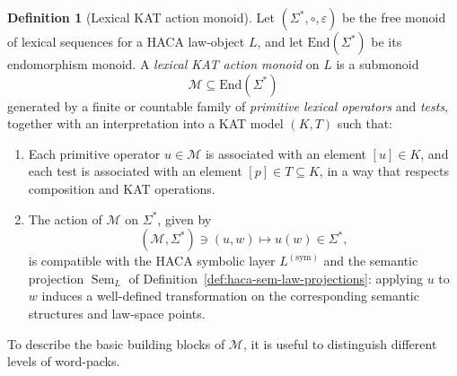 \documentclass[11pt]{book}
\theoremstyle{plain}
\theoremstyle{definition}
\newtheorem{definition}[theorem]{Definition}
\theoremstyle{remark}
\begin{document}
\begin{definition}[Lexical KAT action monoid]
\label{def:lex-kat-action-monoid}
Let $(\Sigma^*,\circ,\varepsilon)$ be the free monoid of lexical
sequences for a HACA law-object $L$, and let $\mathrm{End}(\Sigma^*)$
be its endomorphism monoid. A \emph{lexical KAT action monoid} on $L$
is a submonoid
\[
  \mathcal{M} \subseteq \mathrm{End}(\Sigma^*)
\]
generated by a finite or countable family of \emph{primitive lexical
operators} and \emph{tests}, together with an interpretation into a
KAT model $(K,T)$ such that:
\begin{enumerate}
  \item Each primitive operator $u\in\mathcal{M}$ is associated with an
        element $[u]\in K$, and each test is associated with an element
        $[p]\in T\subseteq K$, in a way that respects composition and
        KAT operations.
  \item The action of $\mathcal{M}$ on $\Sigma^*$, given by
        \[
          (\mathcal{M},\Sigma^*)\ni (u,w)
          \longmapsto u(w)\in\Sigma^*,
        \]
        is compatible with the HACA symbolic layer $L^{(\mathrm{sym})}$
        and the semantic projection $\operatorname{Sem}_L$ of
        Definition~\ref{def:haca-sem-law-projections}: applying $u$ to
        $w$ induces a well-defined transformation on the corresponding
        semantic structures and law-space points.
\end{enumerate}
\end{definition}

To describe the basic building blocks of $\mathcal{M}$, it is useful
to distinguish different levels of word-packs.
\end{document}
